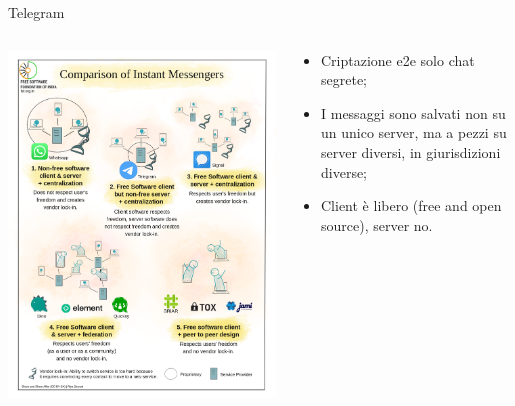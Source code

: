 \begin{myframe}{Telegram}
  \begin{columns}
    \begin{column}{.5\textwidth}
      \includegraphics[width=.9\textwidth]{img/chat}
    \end{column}
    \begin{column}{.5\textwidth}
      \begin{itemize}[<+->]
        \item Criptazione e2e solo chat segrete;
        \item I messaggi sono salvati non su un unico server, ma a pezzi su server diversi, in giurisdizioni diverse;
        \item Client è libero (free and open source), server no.
      \end{itemize}
    \end{column}
  \end{columns}
\end{myframe}


